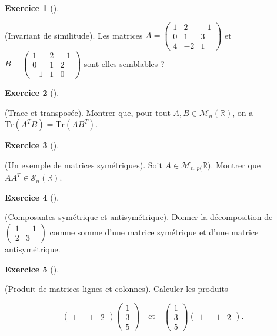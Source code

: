 \documentclass[
  french,
  letterpaper,
  DIV=11,
  numbers=noendperiod]{scrreprt}
\theoremstyle{plain}
\theoremstyle{definition}
\theoremstyle{plain}
\theoremstyle{plain}
\theoremstyle{definition}
\newtheorem{exercise}{Exercice}[chapter]
\theoremstyle{definition}
\theoremstyle{plain}
\theoremstyle{remark}
\begin{document}
\begin{exercise}[]\protect\hypertarget{exr-03-0005}{}\label{exr-03-0005}

(Invariant de similitude). Les matrices \(A = \begin{pmatrix}
    1&2&-1\\
    0&1&3\\
    4&-2&1
\end{pmatrix}\) et \(B = \begin{pmatrix}
    1&2&-1\\
    0&1&2\\
    -1&1&0
\end{pmatrix}\) sont-elles semblables ?

\end{exercise}

\begin{exercise}[]\protect\hypertarget{exr-03-trace-3}{}\label{exr-03-trace-3}

(Trace et transposée). Montrer que, pour tout
\(A,B\in\mathcal{M}_n(\mathbb{R})\), on a
\(\mathrm{Tr}(A^TB)=\mathrm{Tr}(AB^T)\).

\end{exercise}

\begin{exercise}[]\protect\hypertarget{exr-03-sn-2}{}\label{exr-03-sn-2}

(Un exemple de matrices symétriques). Soit
\(A\in\mathcal{M}_{n,p(}\mathbb{R})\). Montrer que
\(AA^T\in \mathcal{S}_n(\mathbb{R})\).

\end{exercise}

\begin{exercise}[]\protect\hypertarget{exr-03-sn}{}\label{exr-03-sn}

(Composantes symétrique et antisymétrique). Donner la décomposition de
\(\begin{pmatrix} 1&-1\\ 2&3 \end{pmatrix}\) comme somme d'une matrice
symétrique et d'une matrice antisymétrique.

\end{exercise}

\begin{exercise}[]\protect\hypertarget{exr-03-0006}{}\label{exr-03-0006}

(Produit de matrices lignes et colonnes). Calculer les produits

\[
\begin{pmatrix}
1&-1&2 \end{pmatrix}\begin{pmatrix} 1\\3\\5 \end{pmatrix}\quad \text{et}\quad \begin{pmatrix}
1\\3\\5 \end{pmatrix}\begin{pmatrix} 1&-1&2 \end{pmatrix}.
\]

\end{exercise}
\end{document}
